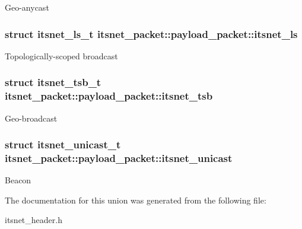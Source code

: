 \-Geo-\/anycast \hypertarget{unionitsnet__packet_1_1payload__packet_abd7c6c7582fe551f1fbd6e40ed451576}{
\subsubsection[{itsnet\-\_\-ls}]{\setlength{\rightskip}{0pt plus 5cm}struct {\bf itsnet\-\_\-ls\-\_\-t} {\bf itsnet\-\_\-packet\-::payload\-\_\-packet\-::itsnet\-\_\-ls}}}\label{unionitsnet__packet_1_1payload__packet_abd7c6c7582fe551f1fbd6e40ed451576}
\-Topologically-\/scoped broadcast \hypertarget{unionitsnet__packet_1_1payload__packet_aaceedda6aa677f9c47fadac0eee8231f}{
\subsubsection[{itsnet\-\_\-tsb}]{\setlength{\rightskip}{0pt plus 5cm}struct {\bf itsnet\-\_\-tsb\-\_\-t} {\bf itsnet\-\_\-packet\-::payload\-\_\-packet\-::itsnet\-\_\-tsb}}}\label{unionitsnet__packet_1_1payload__packet_aaceedda6aa677f9c47fadac0eee8231f}
\-Geo-\/broadcast \hypertarget{unionitsnet__packet_1_1payload__packet_a18392dccee1c690a56a5e86af985a5a2}{
\subsubsection[{itsnet\-\_\-unicast}]{\setlength{\rightskip}{0pt plus 5cm}struct {\bf itsnet\-\_\-unicast\-\_\-t} {\bf itsnet\-\_\-packet\-::payload\-\_\-packet\-::itsnet\-\_\-unicast}}}\label{unionitsnet__packet_1_1payload__packet_a18392dccee1c690a56a5e86af985a5a2}
\-Beacon 

\-The documentation for this union was generated from the following file\-:\begin{DoxyCompactItemize}
\item 
itsnet\-\_\-header.\-h\end{DoxyCompactItemize}
